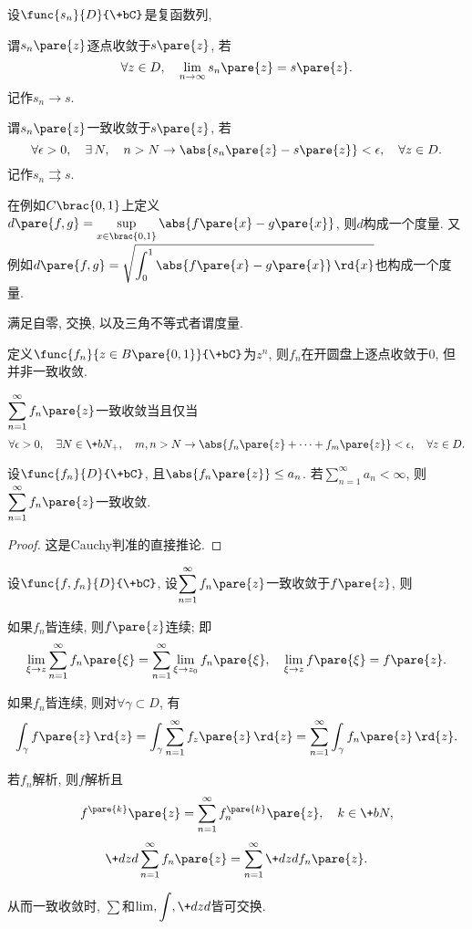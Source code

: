 \documentclass[../ComplexVariable.tex]{subfiles}
\begin{document}
\begin{definition}
    设$\func{s_n}{D}{\+bC}$是复函数列,
    \begin{cenum}
        \item 谓$s_n\pare{z}$逐点收敛于$s\pare{z}$, 若
        \[ \forall z\in D,\quad \lim_{n\rightarrow\infty} s_n\pare{z} = s\pare{z}. \]
        记作$s_n \rightarrow s$.
        \item 谓$s_n\pare{z}$一致收敛于$s\pare{z}$, 若
        \[ \forall \epsilon>0,\quad \exists\,N,\quad n>N\rightarrow \abs{s_n\pare{z}-s\pare{z}}<\epsilon,\quad \forall z\in D. \]
        记作$s_n \rightrightarrows s$.
    \end{cenum}
\end{definition}
在例如$C\brac{0,1}$上定义$\displaystyle d\pare{f,g} = \sup_{x\in \brac{0,1}} \abs{f\pare{x} - g\pare{x}}$, 则$d$构成一个度量. 又例如$\displaystyle d\pare{f,g} = \sqrt{\int_0^1 \abs{f\pare{x} - g\pare{x}}\,\rd{x}}$也构成一个度量.
\begin{remark}
    满足自零, 交换, 以及三角不等式者谓度量.
\end{remark}
\begin{ex}
    定义$\func{f_n}{z\in B\pare{0,1}}{\+bC}$为$z^n$, 则$f_n$在开圆盘上逐点收敛于$0$, 但并非一致收敛.
\end{ex}
\begin{theorem}[Cauchy判准]
    $\displaystyle \sum_{n=1}^\infty f_n\pare{z}$一致收敛当且仅当
    \[ \forall \epsilon > 0,\quad \exists N\in \+bN_+,\quad m,n>N\rightarrow \abs{f_n\pare{z} + \cdots + f_m\pare{z}} < \epsilon,\quad \forall z\in D. \]
\end{theorem}
\begin{theorem}[Weierstra\ss 判准]
    设$\func{f_n}{D}{\+bC}$, 且$\abs{f_n\pare{z}} \le a_n$. 若$\displaystyle \sum_{n=1}^\infty a_n <\infty$, 则$\displaystyle \sum_{n=1}^\infty f_n\pare{z}$一致收敛.
\end{theorem}
\begin{proof}
    这是Cauchy判准的直接推论.
\end{proof}
\begin{theorem}[Weierstra\ss 定理]
    \label{thm:weierstrass定理}
    设$\func{f,f_n}{D}{\+bC}$, 设$\displaystyle \sum_{n=1}^\infty f_n\pare{z}$一致收敛于$f\pare{z}$, 则
    \begin{cenum}
        \item 如果$f_n$皆连续, 则$f\pare{z}$连续; 即
        \[ \lim_{\xi \rightarrow z} \sum_{n=1}^\infty f_n\pare{\xi} = \sum_{n=1}^\infty \lim_{\xi \rightarrow z_0} f_n\pare{\xi},\quad \lim_{\xi\rightarrow z} f\pare{\xi} = f\pare{z}. \]
        \item 如果$f_n$皆连续, 则对$\forall \gamma \subset D$, 有
        \[ \int_\gamma f\pare{z}\,\rd{z} = \int_\gamma \sum_{n=1}^\infty f_z\pare{z}\,\rd{z} = \sum_{n=1}^\infty \int_\gamma f_n\pare{z}\,\rd{z}. \]
        \item 若$f_n$解析, 则$f$解析且
        \[ f^{\pare{k}}\pare{z} = \sum_{n=1}^\infty f^{\pare{k}}_n\pare{z},\quad k\in \+bN, \]
        \[ \+dzd{}\sum_{n=1}^\infty f_n\pare{z} = \sum_{n=1}^\infty \+dzd{} f_n\pare{z}. \]
    \end{cenum}
    从而一致收敛时, $\sum$和$\displaystyle \lim, \int, \+dzd{}$皆可交换.
\end{theorem}
\end{document}
